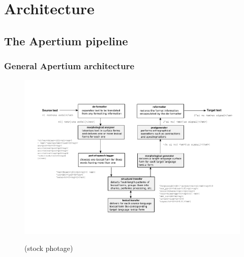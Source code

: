 \documentclass[notes=hide]{beamer}
\begin{document}
\section{Architecture}
\subsection{The Apertium pipeline}
\begin{frame}\frametitle{General Apertium architecture}
  \begin{figure}[ht]
    \textheight
    \hspace*{-0.03\textwidth}
    \centerline{\includegraphics[width=1.2\textwidth]{apertium-general-architecture}}
    \tiny{(stock photage)}
    \label{fig:general-architecture}
  \end{figure}
\end{frame}
\end{document}
